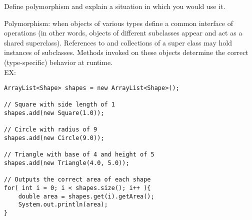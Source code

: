 Define polymorphism and explain a situation in which you would use it. \\
\begin{answer}
Polymorphism: when objects of various types define a common interface of operations (in other words, objects of different subclasses appear and act as a shared superclass). References to and collections of a super class may hold instances of subclasses. Methods invoked on these objects determine the correct (type-specific) behavior at runtime. \\
EX:
		\begin{lstlisting}
ArrayList<Shape> shapes = new ArrayList<Shape>();

// Square with side length of 1
shapes.add(new Square(1.0));

// Circle with radius of 9
shapes.add(new Circle(9.0));

// Triangle with base of 4 and height of 5
shapes.add(new Triangle(4.0, 5.0));

// Outputs the correct area of each shape
for( int i = 0; i < shapes.size(); i++ ){ 
   	double area = shapes.get(i).getArea();
   	System.out.println(area);
}
        \end{lstlisting}
\end{answer}